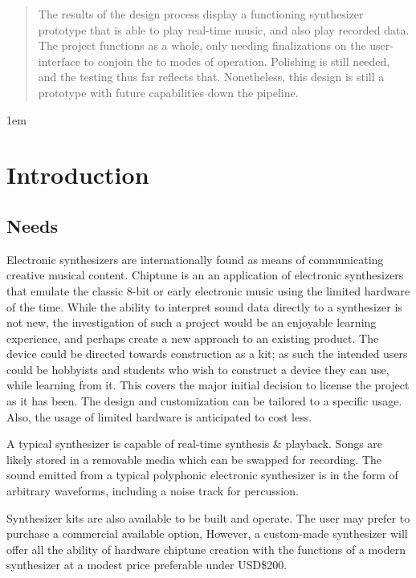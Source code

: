 \documentclass[bibtotocnumbered,abstract=on,paper=a4,fontsize=12pt,parskip=on,halfparskip=on]{scrartcl}		%
\begin{document}
\begin{abstract}
The results of the design process display a functioning synthesizer prototype that is able to play real-time music, and also play recorded data. The project functions as a whole, only needing finalizations on the user-interface to conjoin the to modes of operation. Polishing is still needed, and the testing thus far reflects that. Nonetheless, this design is still a prototype with future capabilities down the pipeline.

\end{abstract}
\newpage
\begin{tableofcontents}
\end{tableofcontents}
\newpage
  \parskip1em

\section{Introduction}
  \subsection{Needs}
Electronic synthesizers are internationally found as means of communicating creative musical content. Chiptune is an an application of electronic synthesizers that emulate the classic 8-bit or early electronic music using the limited hardware of the time. While the ability to interpret sound data directly to a synthesizer is not new, the investigation of such a project would be an enjoyable learning experience, and perhaps create a new approach to an existing product.  The device could be directed towards construction as a kit; as such the intended users could be hobbyists and students who wish to construct a device they can use, while learning from it. This covers the major initial decision to license the project as it has been. The design and customization can be tailored to a specific usage. Also, the usage of limited hardware is anticipated to cost less.

A typical synthesizer is capable of real-time synthesis \& playback. Songs are likely stored in a removable media which can be swapped for recording. The sound emitted from a typical polyphonic electronic synthesizer is in the form of arbitrary waveforms, including a noise track for percussion.

Synthesizer kits are also available to be built and operate. The user may prefer to purchase a commercial available option, However, a custom-made synthesizer will offer all the ability of hardware chiptune creation with the functions of a modern synthesizer at a modest price preferable under USD\$200. 
\end{document}
